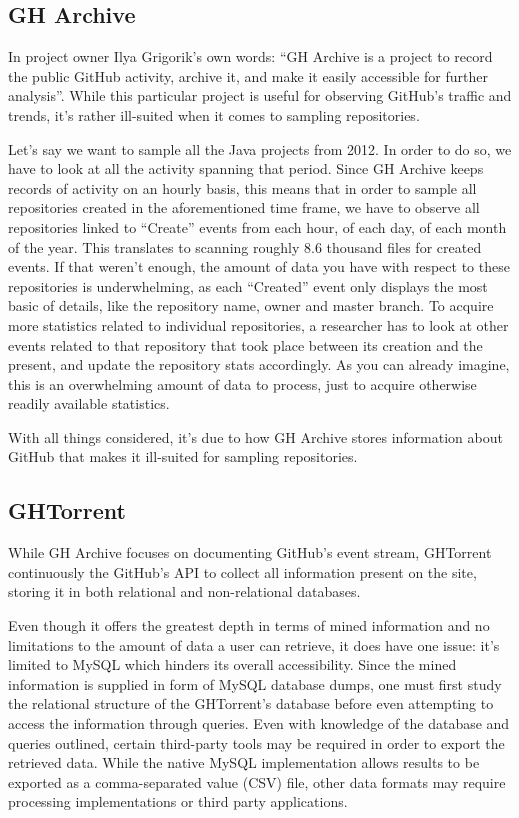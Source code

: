 \subsection{GH Archive}

In project owner Ilya Grigorik's own words: ``GH Archive is a project to record the public GitHub activity, archive it, and make it easily accessible for further analysis''. %
While this particular project is useful for observing GitHub's traffic and trends, it's rather ill-suited when it comes to sampling repositories.

Let's say we want to sample all the Java projects from 2012.
In order to do so, we have to look at all the activity spanning that period.
Since GH Archive keeps records of activity on an hourly basis, this means that in order to sample all repositories created in the aforementioned time frame, we have to observe all repositories linked to ``Create'' events from each hour, of each day, of each month of the year.
This translates to scanning roughly 8.6 thousand files for created events.
If that weren't enough, the amount of data you have with respect to these repositories is underwhelming, as each ``Created'' event only displays the most basic of details, like the repository name, owner and master branch.
To acquire more statistics related to individual repositories, a researcher has to look at other events related to that repository that took place between its creation and the present, and update the repository stats accordingly.
As you can already imagine, this is an overwhelming amount of data to process, just to acquire otherwise readily available statistics.

With all things considered, it's due to how GH Archive stores information about GitHub that makes it ill-suited for sampling repositories.

\subsection{GHTorrent}

While GH Archive focuses on documenting GitHub's event stream, GHTorrent continuously the GitHub's API to collect all information present on the site, storing it in both relational and non-relational databases. %

Even though it offers the greatest depth in terms of mined information and no limitations to the amount of data a user can retrieve, it does have one issue: it's limited to MySQL which hinders its overall accessibility.
Since the mined information is supplied in form of MySQL database dumps, one must first study the relational structure of the GHTorrent's database before even attempting to access the information through queries.
Even with knowledge of the database and queries outlined, certain third-party tools may be required in order to export the retrieved data.
While the native MySQL implementation allows results to be exported as a comma-separated value (CSV) file, other data formats may require processing implementations or third party applications.
